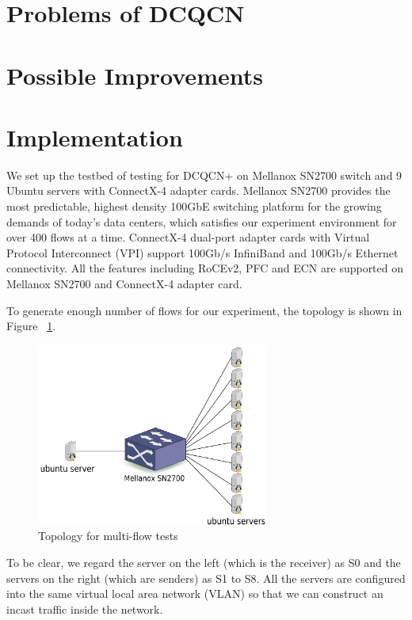 \documentclass{article}
\begin{document}
\section{Problems of DCQCN}


\section{Possible Improvements}


\section{Implementation}

We set up the testbed of testing for DCQCN+ on Mellanox SN2700 switch and 9 Ubuntu servers with ConnectX-4 adapter cards.
Mellanox SN2700 provides the most predictable, highest density 100GbE switching platform for the growing demands of today's data centers,
which satisfies our experiment environment for over 400 flows at a time.
ConnectX-4 dual-port adapter cards with Virtual Protocol Interconnect (VPI) support 100Gb/s InfiniBand and 100Gb/s Ethernet connectivity.
All the features including RoCEv2, PFC and ECN are supported on Mellanox SN2700 and ConnectX-4 adapter card.

To generate enough number of flows for our experiment, the topology is shown in Figure ~\ref{fig:topology}.

\begin{figure}[h]
	\begin{center}
		\includegraphics[width=3in]{topology}
		\caption{Topology for multi-flow tests}
		\label{fig:topology}
	\end{center}
\end{figure}

To be clear, we regard the server on the left (which is the receiver) as S0 and the servers on the right (which are senders) as S1 to S8.
All the servers are configured into the same virtual local area network (VLAN) so that we can construct an incast traffic inside the network.
\end{document}
